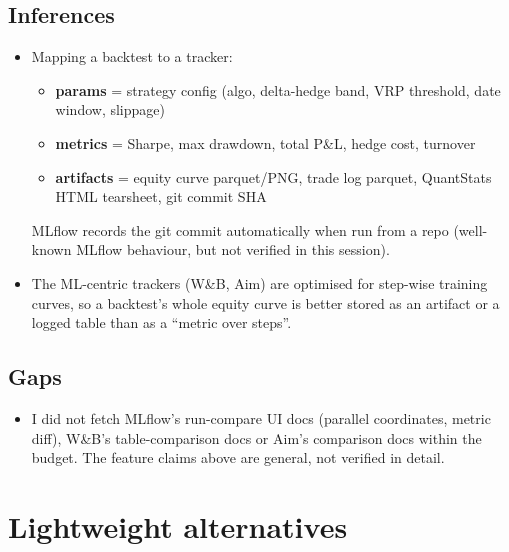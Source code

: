 \documentclass{article}
\begin{document}
\subsection{Inferences}

\begin{itemize}

\item Mapping a backtest to a tracker:

\begin{itemize}

\item \textbf{params} = strategy config (algo, delta-hedge band, VRP threshold, date window, slippage)

\item \textbf{metrics} = Sharpe, max drawdown, total P\&L, hedge cost, turnover

\item \textbf{artifacts} = equity curve parquet/\allowbreak{}PNG, trade log parquet, QuantStats HTML tearsheet, git commit SHA

\end{itemize}

MLflow records the git commit automatically when run from a repo (well-known MLflow behaviour, but not verified in this session).

\item The ML-centric trackers (W\&B, Aim) are optimised for step-wise training curves, so a backtest's whole equity curve is better stored as an artifact or a logged table than as a ``metric over steps''.

\end{itemize}

\subsection{Gaps}

\begin{itemize}

\item I did not fetch MLflow's run-compare UI docs (parallel coordinates, metric diff), W\&B's table-comparison docs or Aim's comparison docs within the budget. The feature claims above are general, not verified in detail.

\end{itemize}

\section{Lightweight alternatives}
\end{document}
